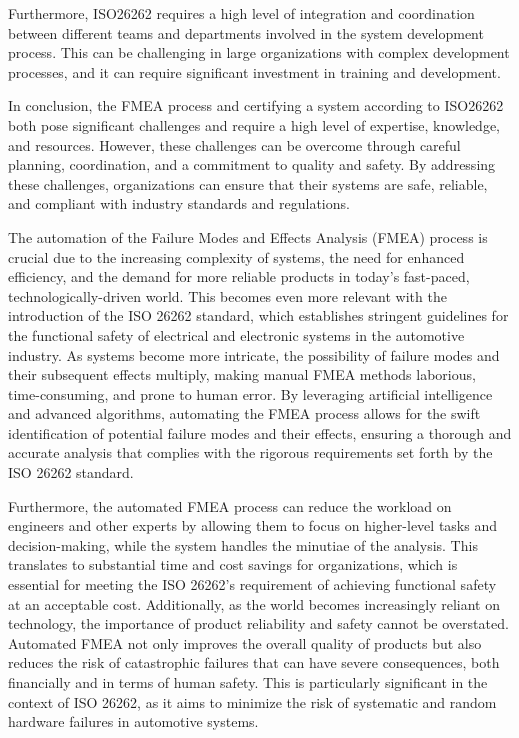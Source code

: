 \documentclass[./dissertation.tex]{subfiles}
\begin{document}
Furthermore, ISO26262 requires a high level of integration and coordination between different teams and departments involved in the system development process. This can be challenging in large organizations with complex development processes, and it can require significant investment in training and development.

In conclusion, the FMEA process and certifying a system according to ISO26262 both pose significant challenges and require a high level of expertise, knowledge, and resources. However, these challenges can be overcome through careful planning, coordination, and a commitment to quality and safety. By addressing these challenges, organizations can ensure that their systems are safe, reliable, and compliant with industry standards and regulations.

The automation of the Failure Modes and Effects Analysis (FMEA) process is crucial due to the increasing complexity of systems, the need for enhanced efficiency, and the demand for more reliable products in today's fast-paced, technologically-driven world. This becomes even more relevant with the introduction of the ISO 26262 standard, which establishes stringent guidelines for the functional safety of electrical and electronic systems in the automotive industry. As systems become more intricate, the possibility of failure modes and their subsequent effects multiply, making manual FMEA methods laborious, time-consuming, and prone to human error. By leveraging artificial intelligence and advanced algorithms, automating the FMEA process allows for the swift identification of potential failure modes and their effects, ensuring a thorough and accurate analysis that complies with the rigorous requirements set forth by the ISO 26262 standard.

Furthermore, the automated FMEA process can reduce the workload on engineers and other experts by allowing them to focus on higher-level tasks and decision-making, while the system handles the minutiae of the analysis. This translates to substantial time and cost savings for organizations, which is essential for meeting the ISO 26262's requirement of achieving functional safety at an acceptable cost. Additionally, as the world becomes increasingly reliant on technology, the importance of product reliability and safety cannot be overstated. Automated FMEA not only improves the overall quality of products but also reduces the risk of catastrophic failures that can have severe consequences, both financially and in terms of human safety. This is particularly significant in the context of ISO 26262, as it aims to minimize the risk of systematic and random hardware failures in automotive systems.
\end{document}
